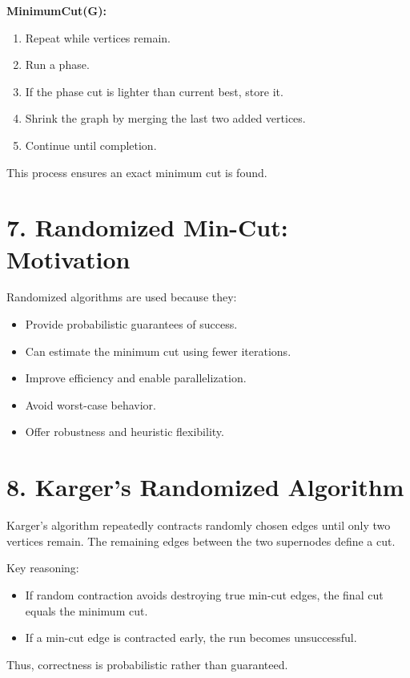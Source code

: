 \documentclass[12pt]{article}
\begin{document}
\textbf{MinimumCut(G):}
\begin{enumerate}
\item Repeat while vertices remain.
\item Run a phase.
\item If the phase cut is lighter than current best, store it.
\item Shrink the graph by merging the last two added vertices.
\item Continue until completion.
\end{enumerate}

This process ensures an exact minimum cut is found.

\section*{7. Randomized Min-Cut: Motivation}

Randomized algorithms are used because they:

\begin{itemize}
\item Provide probabilistic guarantees of success.
\item Can estimate the minimum cut using fewer iterations.
\item Improve efficiency and enable parallelization.
\item Avoid worst-case behavior.
\item Offer robustness and heuristic flexibility.
\end{itemize}

\section*{8. Karger’s Randomized Algorithm}

Karger’s algorithm repeatedly contracts randomly chosen edges until only two vertices remain. The remaining edges between the two supernodes define a cut.

Key reasoning:

\begin{itemize}
\item If random contraction avoids destroying true min-cut edges, the final cut equals the minimum cut.
\item If a min-cut edge is contracted early, the run becomes unsuccessful.
\end{itemize}

Thus, correctness is probabilistic rather than guaranteed.
\end{document}
